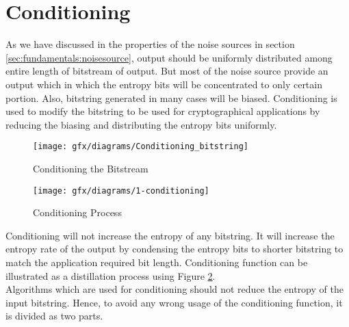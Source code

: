 %
%
\section{Conditioning}
\label{sec:fundamentals:conditioning}
As we have discussed in the properties of the noise sources in section \ref{sec:fundamentals:noisesource}, output should be uniformly distributed among entire length of bitstream of output. But most of the noise source provide an output which in which the entropy bits will be concentrated to only certain portion. Also, bitstring generated in many cases will be biased. Conditioning is used to modify the bitstring to be used for cryptographical applications by reducing the biasing and distributing the entropy bits uniformly. 

\begin{figure}[htbp]
	\centering
	\texttt{[image: gfx/diagrams/Conditioning\_bitstring]}
	\caption{Conditioning the Bitstream}
	\label{fig:2:5}
\end{figure}
 
\begin{figure}[htbp]
	\centering
	\texttt{[image: gfx/diagrams/1-conditioning]}
	\caption{Conditioning Process}
	\label{fig:2:6}
\end{figure}

Conditioning will not increase the entropy of any bitstring. It will increase the entropy rate of the output by condensing the entropy bits to shorter bitstring to match the application required bit length. Conditioning function can be illustrated as a distillation process using Figure \ref{fig:2:6}.\\

Algorithms which are used for conditioning should not reduce the entropy of the input bitstring. Hence, to avoid any wrong usage of the conditioning function, it is divided as two parts.

